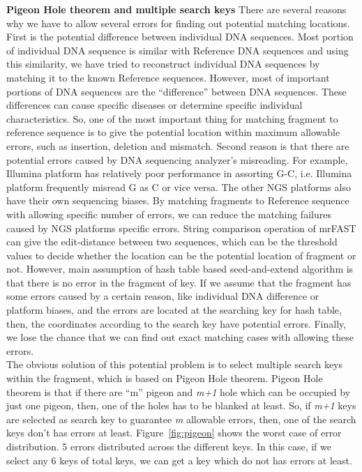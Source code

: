 \textbf{Pigeon Hole theorem and multiple search keys} There are several reasons
why we have to allow several errors for finding out potential matching
locations. First is the potential difference between individual DNA sequences.
Most portion of individual DNA sequence is similar with Reference DNA sequences
and using this similarity, we have tried to reconstruct individual DNA
sequences by matching it to the known Reference sequences. However, most of
important portions of DNA sequences are the “difference” between DNA sequences.
These differences can cause specific diseases or determine specific individual
characteristics. So, one of the most important thing for matching fragment to
reference sequence is to give the potential location within maximum allowable
errors, such as insertion, deletion and mismatch. Second reason is that there
are potential errors caused by DNA sequencing analyzer’s misreading. For
example, Illumina platform has relatively poor performance in assorting G-C,
i.e. Illumina platform frequently misread G as C or vice versa. The other NGS
platforms also have their own sequencing biases. By matching fragments to
Reference sequence with allowing specific number of errors, we can reduce the
matching failures caused by NGS platforms specific errors.  String comparison
operation of mrFAST can give the edit-distance between two sequences, which can
be the threshold values to decide whether the location can be the potential
location of fragment or not.  However, main assumption of hash table based
seed-and-extend algorithm is that there is no error in the fragment of key. If
we assume that the fragment has some errors caused by a certain reason, like
individual DNA difference or platform biases, and the errors are located at the
searching key for hash table, then, the coordinates according to the search key
have potential errors.  Finally, we lose the chance that we can find out exact
matching cases with allowing these errors.\\ The obvious solution of this
potential problem is to select multiple search keys within the fragment, which
is based on Pigeon Hole theorem. Pigeon Hole theorem is that if there are “m”
pigeon and \textit{m+1} hole which can be occupied by just one pigeon, then,
one of the holes has to be blanked at least. So, if \textit{m+1} keys are
selected as search key to guarantee \textit{m} allowable errors, then, one of
the search keys don’t has errors at least.  Figure~\ref{fig:pigeon} shows the
worst case of error distribution. 5 errors distributed across the different
keys. In this case, if we select any 6 keys of total keys, we can get a key
which do not has errors at least. 

